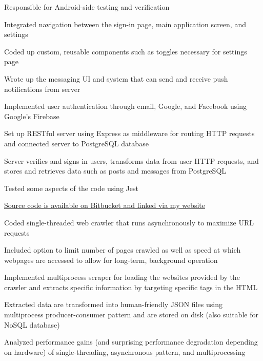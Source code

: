 \documentclass[]{deedy-resume-openfont}
\begin{document}
\begin{tightemize}
\item Responsible for Android-side testing and verification
\item Integrated navigation between the sign-in page, main application screen, and settings
\item Coded up custom, reusable components such as toggles necessary for settings page
\item Wrote up the messaging UI and system that can send and receive push notifications from server
\item Implemented user authentication through email, Google, and Facebook using Google's Firebase
\item Set up RESTful server using Express as middleware for routing HTTP requests and connected server to PostgreSQL database
\item Server verifies and signs in users, transforms data from user HTTP requests, and stores and retrieves data such as posts and messages from PostgreSQL
\item Tested some aspects of the code using Jest
\end{tightemize}
\sectionsep

\begin{tightemize}
\item {\href{https://bitbucket.org/mitchma/scrapeyard}{Source code is available on Bitbucket and linked via my website}}
\item Coded single-threaded web crawler that runs asynchronously to maximize URL requests
\item Included option to limit number of pages crawled as well as speed at which webpages are accessed to allow for long-term, background operation
\item Implemented multiprocess scraper for loading the websites provided by the crawler and extracts specific information by targeting specific tags in the HTML
\item Extracted data are transformed into human-friendly JSON files using multiprocess producer-consumer pattern and are stored on disk (also suitable for NoSQL database)
\item Analyzed performance gains (and surprising performance degradation depending on hardware) of single-threading, asynchronous pattern, and multiprocessing
\end{tightemize}
\sectionsep
\end{document}

